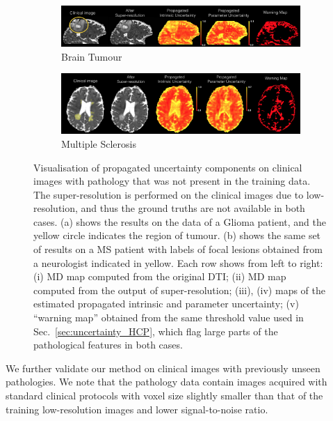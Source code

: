 \begin{figure}[ht]
	\centering
	\begin{subfigure}{\textwidth}
		\caption{Brain Tumour}
		\includegraphics[width=\linewidth]{chapter_3/figures/fig_tumour_02.png}
	\end{subfigure}
	\begin{subfigure}{\textwidth}
		\vspace{2mm}
		\caption{Multiple Sclerosis}
		\includegraphics[width=\linewidth]{chapter_3/figures/fig_ms_03.png}
	\end{subfigure}	
	\caption{Visualisation of propagated uncertainty components on clinical images with pathology that was not present in the training data. The super-resolution is performed on the clinical images due to low-resolution, and thus the ground truths are not available in both cases. (a) shows the results on the data of a Glioma patient, and the yellow circle indicates the region of tumour. (b) shows the same set of results on a MS patient with labels of focal lesions obtained from a neurologist indicated in yellow. Each row shows from left to right: (i) MD map computed from the original DTI; (ii) MD map computed from the output of super-resolution; (iii), (iv) maps of the estimated propagated intrinsic and parameter uncertainty; (v) ``warning map'' obtained from the same threshold value used in Sec.~\ref{sec:uncertainty_HCP}, which flag large parts of the pathological features in both cases. }
	\label{fig:components_pathology}
\end{figure}

We further validate our method on clinical images with previously unseen pathologies. We note that the pathology data contain images acquired with standard clinical protocols with voxel size slightly smaller than that of the training low-resolution images and lower signal-to-noise ratio. 


